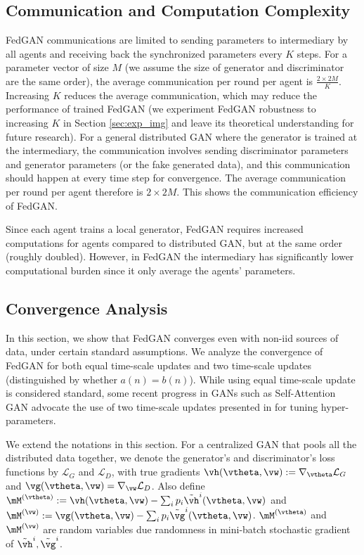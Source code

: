 \documentclass{article}
\begin{document}
	
	
	\subsection{Communication and Computation Complexity}
	\label{sec:communi_comput}
FedGAN communications are limited to sending parameters to intermediary by all agents and receiving back the synchronized parameters every $K$ steps. For a parameter vector of size $M$ (we assume the size of generator and discriminator are the same order), the average communication per round per agent is $\frac{2\times 2M}{K}$. Increasing $K$ reduces the average communication, which may reduce the performance of trained FedGAN (we experiment FedGAN robustness to increasing $K$ in Section \ref{sec:exp_img} and leave its theoretical understanding for future research). For a general distributed GAN where the generator is trained at the intermediary, the communication involves sending discriminator parameters and generator parameters (or the fake generated data), and this communication should happen at every time step for convergence. The average communication per round per agent therefore is $2\times 2M$. This shows the communication efficiency of FedGAN.

    
Since each agent trains a local generator, FedGAN requires increased computations for agents compared to distributed GAN, but at the same order (roughly doubled). However, in FedGAN the intermediary has significantly lower computational burden since it only average the agents' parameters.
    
    
    
	
	\subsection{Convergence Analysis}
	\label{sec:conv_analy}
	
	In this section, we show that FedGAN converges even with non-iid sources of data, under certain standard assumptions. We analyze the convergence of  FedGAN for both equal time-scale updates and two time-scale updates (distinguished by whether $a(n)=b(n)$). While using equal time-scale update is considered standard, some recent progress in GANs such as Self-Attention GAN \citep{zhang2018self}  advocate the use of two time-scale updates presented in \citep{heusel2017gans} for tuning hyper-parameters.
	
	We extend the notations in this section. For a centralized GAN that pools all the distributed data together, we denote the generator's and discriminator's loss functions by $\mathcal{L}_G$ and $\mathcal{L}_D$,  with true gradients $\vh(\vtheta, \vw):=\nabla _\vtheta \mathcal{L}_G$ and $\vg(\vtheta, \vw)=\nabla _\vw \mathcal{L}_D$. Also define ${\mM}^{(\vtheta)}:=\vh(\vtheta, \vw)-\sum_{i} p_i\tilde{\vh}^i(\vtheta, \vw)$ and ${\mM}^{(\vw)}:= \vg(\vtheta, \vw)-\sum_{i} p_i\tilde{\vg}^i(\vtheta, \vw)$.
	${\mM}^{(\vtheta)}$ and ${\mM}^{(\vw)}$
	are random variables due randomness in mini-batch stochastic gradient of $\tilde{\vh}^i,\tilde{\vg}^i$.
	
\end{document}

